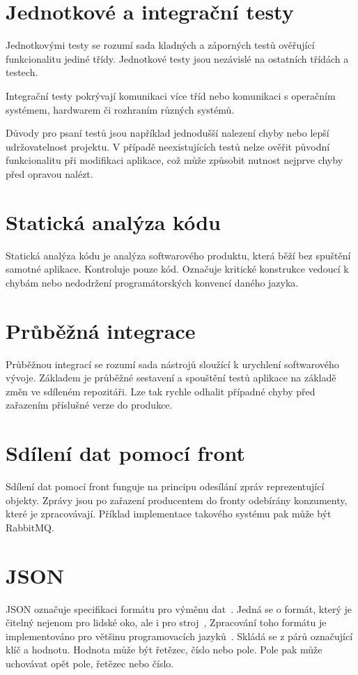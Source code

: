 \documentclass[thesis=B,czech]{FITthesis}[2012/06/26]
\begin{document}
\section{Jednotkové a integrační testy}
Jednotkovými testy se rozumí sada kladných a záporných testů ověřující funkcionalitu jediné třídy. Jednotkové testy
jsou nezávislé na ostatních třídách a testech. \cite{testing} 
\par
Integrační testy pokrývají komunikaci více tříd nebo komunikaci s operačním systémem, hardwarem či rozhraním různých systémů. \cite{testing}
\par
Důvody pro psaní testů jsou například jednodušší nalezení chyby nebo lepší udržovatelnost projektu. V případě neexistujících testů nelze ověřit původní
funkcionalitu při modifikaci aplikace, což může způsobit nutnost nejprve chyby před opravou nalézt.\cite{testing}

\section{Statická analýza kódu}
Statická analýza kódu je analýza softwarového produktu, která běží bez spuštění samotné aplikace. Kontroluje 
pouze kód. Označuje kritické konstrukce vedoucí k chybám nebo nedodržení programátorských konvencí daného
jazyka.
\section{Průběžná integrace}
Průběžnou integrací se rozumí sada nástrojů sloužící k urychlení softwarového vývoje. Základem je průběžné sestavení
a spouštění testů aplikace na základě změn ve sdíleném repozitáři. Lze tak rychle odhalit případné chyby před zařazením 
příslušné verze do produkce.\cite{CI}

\section{Sdílení dat pomocí front}
Sdílení dat pomocí front funguje na principu odesílání zpráv reprezentující objekty. Zprávy jsou po zařazení producentem do fronty odebírány
konzumenty, které je zpracovávají.
Příklad implementace takového systému pak může být RabbitMQ. \cite{rabbitMQ}

\section{JSON}
JSON označuje specifikaci formátu pro výměnu dat~\cite{JSON}. Jedná se o formát, který je čitelný nejenom pro lidské oko, ale i pro stroj~\cite{JSON},
Zpracování toho formátu je implementováno pro většinu programovacích jazyků~\cite{JSON-impl}. Skládá se z párů označující
klíč a hodnotu. Hodnota může být řetězec, číslo nebo pole. Pole pak může uchovávat opět pole, řetězec nebo číslo. \cite{JSON}
\end{document}
